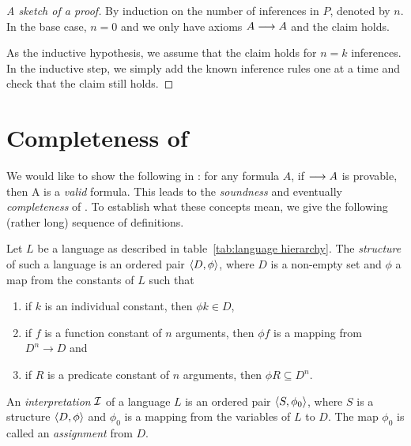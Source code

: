 \documentclass[11pt,a4paper]{article}
\begin{document}
\begin{proof}[A sketch of a proof]
    By induction on the number of inferences in \(P\),
    denoted by \(n\). In the base case, \(n=0\)
    and we only have axioms \(A\longrightarrow A\) and the claim holds.

    As the inductive hypothesis, we assume that the claim holds
    for \(n=k\) inferences. In the inductive step, we simply
    add the known inference rules one at a time and check that
    the claim still holds.
\end{proof}

\section{Completeness of \LK}

We would like to show the following in \LK:
for any formula \(A\), if \(\longrightarrow A\) is provable,
then A is a \emph{valid} formula.
This leads to the \emph{soundness} and eventually \emph{completeness} of \LK.
To establish what these concepts mean, we give the following
(rather long) sequence of definitions.

\begin{definition}\label{def:structure of language}
    Let \(L\) be a language as described in table~\ref{tab:language hierarchy}.
    The \emph{structure} of such a language is an ordered pair \(\langle D,\phi\rangle\),
    where \(D\) is a non-empty set and \(\phi\) a map from the constants of \(L\)
    such that
    \begin{enumerate}
        \item
            if \(k\) is an individual constant, then \(\phi{k}\in D\),
        \item
            if \(f\) is a function constant of \(n\) arguments,
            then \(\phi{f}\) is a mapping from \(D^n\to D\) and
        \item
            if \(R\) is a predicate constant of \(n\) arguments,
            then \(\phi{R}\subseteq D^n\).
    \end{enumerate}
\end{definition}

\begin{definition}\label{def:interpretation of language}
    An \emph{interpretation} \(\mathcal{I}\) of a language \(L\) is an ordered pair \(\langle S,\phi_0\rangle\),
    where \(S\) is a structure \(\langle D,\phi\rangle\) and \(\phi_0\)
    is a mapping from the variables of \(L\) to \(D\).
    The map \(\phi_0\) is called an \emph{assignment} from \(D\).
\end{definition}
\end{document}
